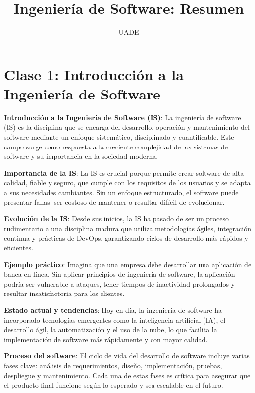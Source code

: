 \documentclass[a4paper,11pt]{article}
\title{Ingeniería de Software: Resumen}
\author{UADE}
\date{}
\begin{document}
\maketitle
\thispagestyle{empty}
\newpage

\section*{Clase 1: Introducción a la Ingeniería de Software}

\textbf{Introducción a la Ingeniería de Software (IS)}: La ingeniería de software (IS) es la disciplina que se encarga del desarrollo, operación y mantenimiento del software mediante un enfoque sistemático, disciplinado y cuantificable. Este campo surge como respuesta a la creciente complejidad de los sistemas de software y su importancia en la sociedad moderna.

\textbf{Importancia de la IS}: La IS es crucial porque permite crear software de alta calidad, fiable y seguro, que cumple con los requisitos de los usuarios y se adapta a sus necesidades cambiantes. Sin un enfoque estructurado, el software puede presentar fallas, ser costoso de mantener o resultar difícil de evolucionar.

\textbf{Evolución de la IS}: Desde sus inicios, la IS ha pasado de ser un proceso rudimentario a una disciplina madura que utiliza metodologías ágiles, integración continua y prácticas de DevOps, garantizando ciclos de desarrollo más rápidos y eficientes.

\textbf{Ejemplo práctico}: Imagina que una empresa debe desarrollar una aplicación de banca en línea. Sin aplicar principios de ingeniería de software, la aplicación podría ser vulnerable a ataques, tener tiempos de inactividad prolongados y resultar insatisfactoria para los clientes.

\textbf{Estado actual y tendencias}: Hoy en día, la ingeniería de software ha incorporado tecnologías emergentes como la inteligencia artificial (IA), el desarrollo ágil, la automatización y el uso de la nube, lo que facilita la implementación de software más rápidamente y con mayor calidad.

\textbf{Proceso del software}: El ciclo de vida del desarrollo de software incluye varias fases clave: análisis de requerimientos, diseño, implementación, pruebas, despliegue y mantenimiento. Cada una de estas fases es crítica para asegurar que el producto final funcione según lo esperado y sea escalable en el futuro.
\end{document}
